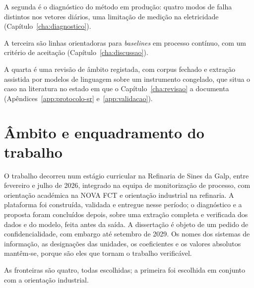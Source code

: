 A segunda é o diagnóstico do método em produção: quatro modos de falha
distintos nos vetores diários, uma limitação de medição na eletricidade
(Capítulo~\ref{cha:diagnostico}).

A terceira são linhas orientadoras para \emph{baselines} em processo
contínuo, com um critério de aceitação 
(Capítulo~\ref{cha:discussao}).

A quarta é uma revisão de âmbito registada, com corpus fechado e
extração assistida por modelos de linguagem sobre um instrumento
congelado, que situa o caso na literatura no estado em que o
Capítulo~\ref{cha:revisao} a documenta
(Apêndices~\ref{app:protocolo-sr} e~\ref{app:validacao}).


\section{Âmbito e enquadramento do trabalho}
\label{sec:ambito}

O trabalho decorreu num estágio curricular na Refinaria de Sines da
Galp, entre fevereiro e julho de 2026, integrado na equipa de
monitorização de processo, com orientação académica na NOVA FCT e
orientação industrial na refinaria. A
plataforma foi construída, validada e entregue nesse período; o
diagnóstico e a proposta foram concluídos depois, sobre uma extração
completa e verificada dos dados e do modelo, feita antes da saída. A
dissertação é objeto de um pedido de confidencialidade, com embargo até
setembro de 2029. Os nomes dos sistemas de informação, as designações
das unidades, os coeficientes e os valores absolutos mantêm-se, porque
são eles que tornam o trabalho verificável.

As fronteiras são quatro, todas escolhidas; a primeira foi escolhida em
conjunto com a orientação industrial.


